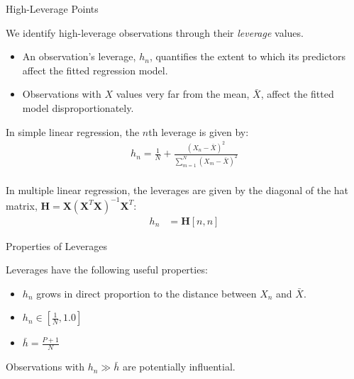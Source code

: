 \documentclass{beamer}\usepackage[]{graphicx}\usepackage[]{color}
\begin{document}

\begin{frame}{High-Leverage Points}
  
  We identify high-leverage observations through their \emph{leverage} values.
  \vb
  \begin{itemize}
  \item An observation's leverage, $h_n$, quantifies the extent to which its
    predictors affect the fitted regression model.  
    \vb
  \item Observations with $X$ values very far from the mean, $\bar{X}$, affect
    the fitted model disproportionately.  
  \end{itemize}
  \vb
  \pause
  In simple linear regression, the $n$th leverage is given by:
  \begin{align*}
    h_n = \frac{1}{N} + \frac{\left(X_n - \bar{X}\right)^2}
    {\sum_{m = 1}^N \left(X_{m} - \bar{X}\right)^2}
  \end{align*}\\
  \pause
  In multiple linear regression, the leverages are given by the diagonal of the 
  hat matrix, $\mathbf{H} = \mathbf{X}(\mathbf{X}^T\mathbf{X})^{-1}\mathbf{X}^T$:
  \begin{align*}
    h_n &= \mathbf{H}[n, n]
  \end{align*}
  
\end{frame}


\begin{frame}{Properties of Leverages}
  
  Leverages have the following useful properties:
  \vb
  \begin{itemize}
  \item $h_n$ grows in direct proportion to the distance between $X_n$ and
    $\bar{X}$.  
    \vb
  \item $h_n \in \left[\frac{1}{N}, 1.0\right]$
    \vb
  \item $\bar{h} = \frac{P + 1}{N}$
  \end{itemize}
  \vb
  Observations with $h_n \gg \bar{h}$ are potentially influential.
  
\end{frame}

\watermarkoff %
\end{document}

